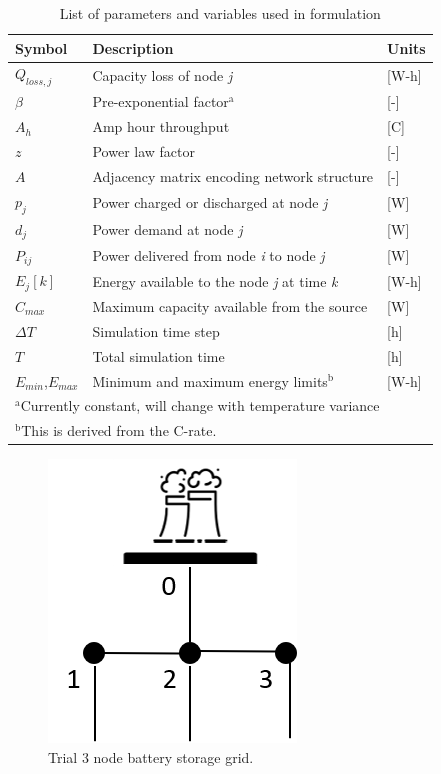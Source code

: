 \documentclass[10]{IEEEtran}
\begin{document}
	\begin{table}[htbp]
		\caption{List of parameters and variables used in formulation}
		\begin{center}
			\begin{tabular}{l|l|l}
				\hline 
				\textbf{Symbol}&\textbf{Description}&\textbf{Units} \\ \hline
				$Q_{loss,j}$ & Capacity loss of node \textit{j} & [W-h]\\
				$\beta$ & Pre-exponential factor$^{\mathrm{a}}$ & [-]\\
				$A_h$ & Amp hour throughput & [C]\\ 
				$z$ & Power law factor & [-] \\ \hline
				$A$ & Adjacency matrix encoding network structure & [-]\\
				$p_j$ & Power charged or discharged at node \textit{j} & [W]\\
				$d_j$ & Power demand at node \textit{j} & [W]\\
				$P_{ij}$ & Power delivered from node \textit{i} to node \textit{j} & [W]\\
				$E_j[k]$ & Energy available to the node \textit{j} at time \textit{k} & [W-h]\\ \hline
				$C_{max}$ & Maximum capacity available from the source & [W]\\
				$\Delta T$ & Simulation time step & [h]\\
				$T$ & Total simulation time & [h]\\
				$E_{min}$,$E_{max}$ & Minimum and maximum energy limits$^{\mathrm{b}}$ & [W-h]\\
			\hline
			\multicolumn{3}{l}{$^{\mathrm{a}}$Currently constant, will change with temperature variance}\\
			\multicolumn{3}{l}{$^{\mathrm{b}}$This is derived from the C-rate.}	
			\end{tabular}
			\label{t1}
		\end{center}
	\end{table}
	
	\begin{figure}[htbp]
		\centerline{\includegraphics{fig6.png}}
		\caption{Trial 3 node battery storage grid.}
		\label{f5}
	\end{figure}
	
\end{document}
